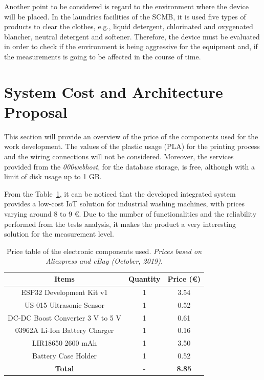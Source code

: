 Another point to be considered is regard to the environment where the device will be placed. In the laundries facilities of the \gls{SCMB}, it is used five types of products to clear the clothes, e.g., liquid detergent, chlorinated and oxygenated blancher, neutral detergent and softener. Therefore, the device must be evaluated in order to check if the environment is being aggressive for the equipment and, if the measurements is going to be affected in the course of time. 

\section{System Cost and Architecture Proposal}\label{section:systemCost}

This section will provide an overview of the price of the components used for the work development. The values of the plastic usage (PLA) for the printing process and the wiring connections will not be considered. Moreover, the services provided from the \textit{000webhost}, for the database storage, is free, although with a limit of disk usage up to 1 GB.

From the Table~\ref{table:cost}, it can be noticed that the developed integrated system provides a low-cost \gls{IoT} solution for industrial washing machines, with prices varying around 8 to 9 \euro. Due to the number of functionalities and the reliability performed from the tests analysis, it makes the product a very interesting solution for the measurement level.

\begin{table}[h!]
    \centering
    \begin{tabular}{@{}ccc@{}}
        \toprule
        \textbf{Items} & \textbf{Quantity} & \textbf{Price (\euro)} \\ \midrule
        \rowcolor[HTML]{EFEFEF} 
        ESP32 Development Kit v1 & 1 & 3.54 \\
        US-015 Ultrasonic Sensor & 1 & 0.52 \\
        \rowcolor[HTML]{EFEFEF} 
        DC-DC Boost Converter 3 V to 5 V & 1 & 0.61 \\
        03962A Li-Ion Battery Charger & 1 & 0.16 \\
        \rowcolor[HTML]{EFEFEF} 
        LIR18650 2600 mAh & 1 & 3.50 \\
        Battery Case Holder & 1 & 0.52 \\ \hline
        \rowcolor[HTML]{EFEFEF} 
        \textbf{Total} & - & \textbf{8.85} \\ \bottomrule
    \end{tabular}
    \caption{Price table of the electronic components used. \textit{Prices based on Aliexpress and eBay (October, 2019)}.}
    \label{table:cost}
\end{table}

